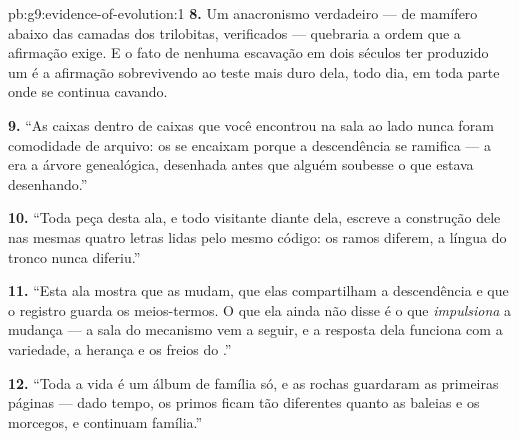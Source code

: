 \begin{solution}{pb:g9:evidence-of-evolution:1}
\textbf{8.} Um anacronismo verdadeiro ---  de mamífero
abaixo das camadas dos trilobitas, verificados --- quebraria
a ordem que a afirmação exige. E o fato de nenhuma escavação
em dois séculos ter produzido um é a afirmação sobrevivendo ao
teste mais duro dela, todo dia, em toda parte onde se
continua cavando.

\textbf{9.} ``As caixas dentro de caixas que você encontrou
na sala ao lado nunca foram comodidade de arquivo: os
 se encaixam porque a descendência se ramifica --- a
 era a árvore genealógica, desenhada antes que
alguém soubesse o que estava desenhando.''

\textbf{10.} ``Toda peça desta ala, e todo visitante diante
dela, escreve a construção dele nas mesmas quatro letras
lidas pelo mesmo código: os ramos diferem, a língua do tronco
nunca diferiu.''

\textbf{11.} ``Esta ala mostra que as  mudam, que
elas compartilham a descendência e que o registro guarda os
meios-termos. O que ela ainda não disse é o que
\emph{impulsiona} a mudança --- a sala do mecanismo vem a
seguir, e a resposta dela funciona com a variedade, a herança
e os freios do .''

\textbf{12.} ``Toda a vida é um álbum de família só, e as
rochas guardaram as primeiras páginas --- dado tempo, os
primos ficam tão diferentes quanto as baleias e os morcegos,
e continuam família.''
\end{solution}
